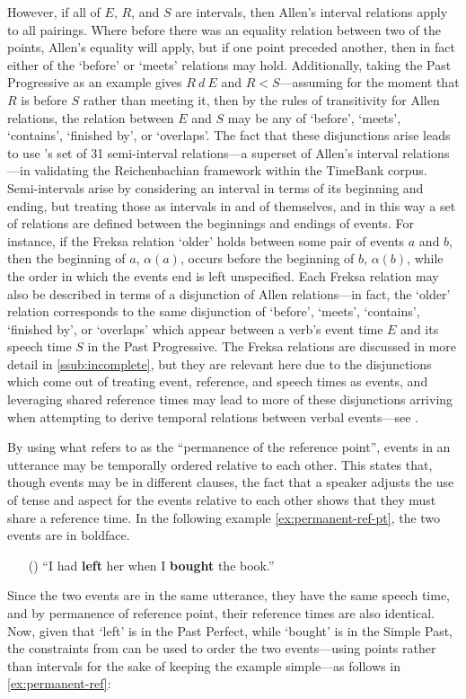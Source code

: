 \documentclass[a4paper,12pt,leqno]{article}
\newcommand{\ipp}{(\refstepcounter{equation}\theequation)}
\begin{document}
However, if all of $E$, $R$, and $S$ are intervals, then Allen's interval relations apply to all pairings. Where before there was an equality relation between two of the points, Allen's equality will apply, but if one point preceded another, then in fact either of the `before' or `meets' relations may hold. Additionally, taking the Past Progressive as an example gives $R ~d~ E$ and $R < S$---assuming for the moment that $R$ is before $S$ rather than meeting it, then by the rules of transitivity for Allen relations, the relation between $E$ and $S$ may be any of `before', `meets', `contains', `finished by', or `overlaps'. The fact that these disjunctions arise leads \citet{Derczynski2013} to use \citet{Freksa1992}'s set of 31 semi-interval relations---a superset of Allen's interval relations---in validating the Reichenbachian framework within the TimeBank \citep{pustejovsky2006timebank} corpus. Semi-intervals arise by considering an interval in terms of its beginning and ending, but treating those as intervals in and of themselves, and in this way a set of relations are defined between the beginnings and endings of events. For instance, if the Freksa relation `older' holds between some pair of events $a$ and $b$, then the beginning of $a$, $\alpha(a)$, occurs before the beginning of $b$, $\alpha(b)$, while the order in which the events end is left unspecified. Each Freksa relation may also be described in terms of a disjunction of Allen relations---in fact, the `older' relation corresponds to the same disjunction of `before', `meets', `contains', `finished by', or `overlaps' which appear between a verb's event time $E$ and its speech time $S$ in the Past Progressive. The Freksa relations are discussed in more detail in \cref{ssub:incomplete}, but they are relevant here due to the disjunctions which come out of treating event, reference, and speech times as events, and leveraging shared reference times may lead to more of these disjunctions arriving when attempting to derive temporal relations between verbal events---see .

By using what \citet[p. 74]{reichenbach1947elements} refers to as the ``permanence of the reference point'', events in an utterance may be temporally ordered relative to each other. This states that, though events may be in different clauses, the fact that a speaker adjusts the use of tense and aspect for the events relative to each other shows that they must share a reference time. In the following example \cref{ex:permanent-ref-pt}, the two events are in boldface.
\begin{itemize}
	\item[\ipp\label{ex:permanent-ref-pt}] ``I had \textbf{left} her when I \textbf{bought} the book.''
\end{itemize}
Since the two events are in the same utterance, they have the same speech time, and by permanence of reference point, their reference times are also identical. Now, given that `left' is in the Past Perfect, while `bought' is in the Simple Past, the constraints from  can be used to order the two events---using points rather than intervals for the sake of keeping the example simple---as follows in \cref{ex:permanent-ref}:
\end{document}
